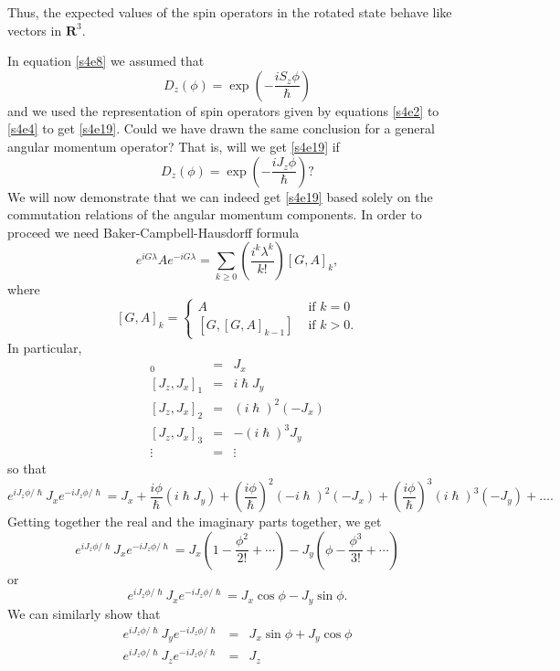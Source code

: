 \documentclass{article}
\numberwithin{equation}{section}
\begin{document}
Thus, the expected values of the spin operators in the rotated state behave 
like vectors in $\mathbf{R}^3$.

In equation \eqref{s4e8} we assumed that 
\[
D_z(\phi) = \exp\left(-\frac{iS_z\phi}{\hslash}\right)
\]
and we used the representation of spin operators given by equations \eqref{s4e2}
to \eqref{s4e4} to get \eqref{s4e19}. Could we have drawn the same conclusion
for a general angular momentum operator? That is, will we get \eqref{s4e19}
if
\begin{equation}\label{s4e20}
D_z(\phi) = \exp\left(-\frac{iJ_z\phi}{\hslash}\right)?
\end{equation}
We will now demonstrate that we can indeed get \eqref{s4e19} based solely on
the commutation relations of the angular momentum components. In order to 
proceed we need Baker-Campbell-Hausdorff formula
\begin{equation}\label{s4e21}
e^{iG\lambda}Ae^{-iG\lambda} = 
\sum_{k \ge 0}\left(\frac{i^k\lambda^k}{k!}\right)[G, A]_k,
\end{equation}
where
\begin{equation}\label{s4e22}
[G, A]_k = \begin{cases}
A & \text{ if } k = 0 \\
[G, [G, A]_{k-1}] & \text{ if } k > 0.
\end{cases}
\end{equation}
In particular,
\begin{eqnarray}
[J_z, J_x]_0 &=& J_x \label{s4e23} \\
{}[J_z, J_x]_1 &=& i\hslash J_y \label{s4e24} \\
{}[J_z, J_x]_2 &=& (i\hslash)^2 (-J_x) \label{s4e25} \\
{}[J_z, J_x]_3 &=& -(i\hslash)^3 J_y \label{s4e26} \\
\vdots &=& \vdots \nonumber
\end{eqnarray}
so that
\[
e^{iJ_z\phi/\hslash}J_xe^{-iJ_z\phi/\hslash} = J_x + \frac{i\phi}{\hslash}
(i\hslash J_y) + \left(\frac{i\phi}{\hslash}\right)^2(-i\hslash)^2(-J_x)
+ \left(\frac{i\phi}{\hslash}\right)^3(i\hslash)^3(-J_y) + \ldots.
\]
Getting together the real and the imaginary parts together, we get
\[
e^{iJ_z\phi/\hslash}J_xe^{-iJ_z\phi/\hslash} = J_x\left(1 - \frac{\phi^2}{2!}
+ \cdots\right) - J_y\left(\phi - \frac{\phi^3}{3!} + \cdots\right)
\]
or
\begin{equation}\label{s4e27}
e^{iJ_z\phi/\hslash}J_xe^{-iJ_z\phi/\hslash} = J_x\cos\phi - J_y\sin\phi.
\end{equation}
We can similarly show that
\begin{eqnarray}
e^{iJ_z\phi/\hslash}J_ye^{-iJ_z\phi/\hslash} &=& J_x\sin\phi + J_y\cos\phi 
\label{s4e28} \\
e^{iJ_z\phi/\hslash}J_ze^{-iJ_z\phi/\hslash} &=& J_z \label{s4e29}
\end{eqnarray}
\end{document}
